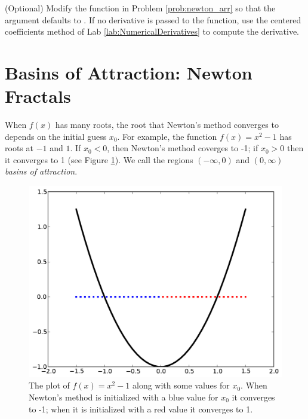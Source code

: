 \begin{problem}(Optional)
Modify the function  in Problem \ref{prob:newton_arr} so that the argument  defaults to .
If no derivative is passed to the function, use the centered coefficients method of Lab \ref{lab:NumericalDerivatives} to compute the derivative.
\end{problem}

\section*{Basins of Attraction: Newton Fractals}
When $f(x)$ has many roots, the root that Newton's method converges to depends on the initial guess $x_0$.
For example, the function $f(x)=x^2-1$ has roots at $-1$ and $1$.
If $x_0<0$, then Newton's method coverges to -1; if $x_0>0$ then it converges to 1 (see Figure \ref{fig:basins1}).
We call the regions $(-\infty, 0)$ and $(0, \infty)$ \emph{basins of attraction}.

\begin{figure}
\begin{center}
\includegraphics[scale=0.5]{basins1}
\caption{The plot of $f(x) = x^2 -1$ along with some values for $x_0$.
When Newton's method is initialized with a blue value for $x_0$ it converges to -1; when it is initialized with a red value it converges to 1.}
\label{fig:basins1}
\end{center}
\end{figure}

